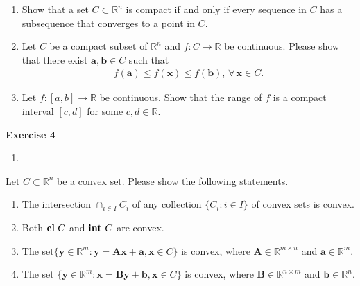\documentclass[11pt,letter,notitlepage]{article}
\theoremstyle{definition}
\DeclareMathOperator*{\intp}{\bf int\,}
\DeclareMathOperator*{\cl}{\bf cl\,}
\begin{document}
		
		\newpage
		
		
		
		\begin{exercise}
			\begin{enumerate}
				\item Show that a set $C \subset \mathbb{R}^n$ is compact if and only if every sequence in $C$ has a subsequence that converges to a point in $C$.
				\item Let $C$ be a compact subset of $\mathbb{R}^n$ and $f:C \rightarrow \mathbb{R}$ be continuous. Please show that there exist $\mathbf{a},\mathbf{b} \in C$ such that
				\begin{align*}
					f(\mathbf{a}) \leq f(\mathbf{x}) \leq f(\mathbf{b}),\,\forall\,\mathbf{x}\in C.
				\end{align*}
				\item Let $f: \left[ a,b \right] \rightarrow\mathbb{R}$ be continuous. Show that the range of $f$ is a compact interval $\left[c,d \right]$ for some $c,d \in \mathbb{R}$.
			\end{enumerate}
		\end{exercise}
		\begin{solution}
			\textbf{Exercise 4}
			\begin{enumerate}
                \item
                
			\end{enumerate}

		\end{solution}
		
		
		\newpage
		
		\begin{exercise}
			Let $C \subset \mathbb{R}^n$ be a convex set. Please show the following statements.
			\begin{enumerate}
				\item The intersection $\cap_{i \in I}C_i$ of any collection $\{ C_i:i\in I \}$ of convex sets is convex.
				\item Both $\cl C $ and $\intp C $ are convex.
				\item The set$\{ \mathbf{y}\in\mathbb{R}^m:\mathbf{y}=\mathbf{Ax}+\mathbf{a},\mathbf{x}\in C \}$ is convex, where $\mathbf{A} \in \mathbb{R}^{m \times n}$ and $\mathbf{a} \in \mathbb{R}^m$.
				\item The set $\{ \mathbf{y}\in\mathbb{R}^m:\mathbf{x}=\mathbf{By}+\mathbf{b},\mathbf{x}\in C \}$ is convex, where $\mathbf{B} \in \mathbb{R}^{n \times m}$ and $\mathbf{b} \in \mathbb{R}^n$.
			\end{enumerate}
		\end{exercise}
		\begin{solution}
			
		\end{solution}
		
\end{document}
